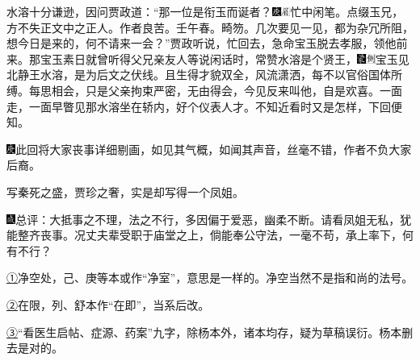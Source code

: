 水溶十分谦逊，因问贾政道：``那一位是衔玉而诞者？{\includegraphics[width=3mm]{../Images/00004}\includegraphics[width=3mm]{../Images/00010}\footnotesize \kaishu 忙中闲笔。点缀玉兄，方不失正文中之正人。作者良苦。壬午春。畸笏。}几次要见一见，都为杂冗所阻，想今日是来的，何不请来一会？''贾政听说，忙回去，急命宝玉脱去孝服，领他前来。那宝玉素日就曾听得父兄亲友人等说闲话时，常赞水溶是个贤王，{\includegraphics[width=3mm]{../Images/00006}\includegraphics[width=3mm]{../Images/00011}\footnotesize \kaishu 宝玉见北静王水溶，是为后文之伏线。}且生得才貌双全，风流潇洒，每不以官俗国体所缚。每思相会，只是父亲拘束严密，无由得会，今见反来叫他，自是欢喜。一面走，一面早瞥见那水溶坐在轿内，好个仪表人才。不知近看时又是怎样，下回便知。

{{\includegraphics[width=3mm]{../Images/00004}此回将大家丧事详细剔画，如见其气概，如闻其声音，丝毫不错，作者不负大家后裔。}}

{{写秦死之盛，贾珍之奢，实是却写得一个凤姐。}}

{\includegraphics[width=3mm]{../Images/00005}总评：大抵事之不理，法之不行，多因偏于爱恶，幽柔不断。请看凤姐无私，犹能整齐丧事。况丈夫辈受职于庙堂之上，倘能奉公守法，一毫不苟，承上率下，何有不行？}

{\href{../Text/part0018_split_000.html\#navto_1_a}{①}净空处，己、庚等本或作``净室''，意思是一样的。净空当然不是指和尚的法号。}

{\href{../Text/part0018_split_000.html\#navto_2_a}{②}在限，列、舒本作``在即''，当系后改。}

{\href{../Text/part0018_split_000.html\#navto_3_a}{③}``看医生启帖、症源、药案''九字，除杨本外，诸本均存，疑为草稿误衍。杨本删去是对的。}

